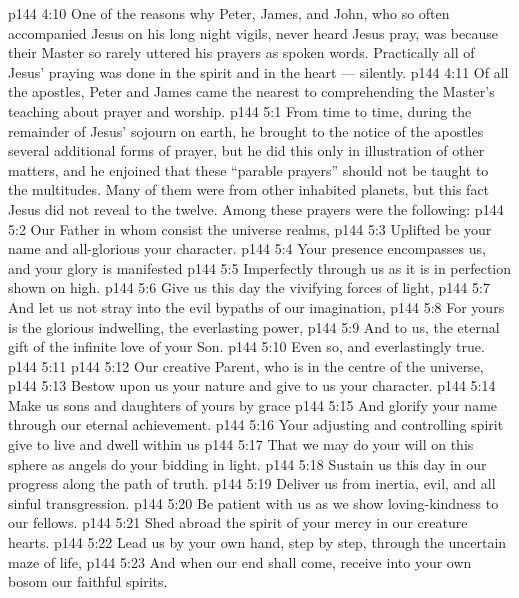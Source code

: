 \vs p144 4:10 \pc One of the reasons why Peter, James, and John, who so often accompanied Jesus on his long night vigils, never heard Jesus pray, was because their Master so rarely uttered his prayers as spoken words. Practically all of Jesus’ praying was done in the spirit and in the heart --- silently.
\vs p144 4:11 Of all the apostles, Peter and James came the nearest to comprehending the Master’s teaching about prayer and worship.
\vs p144 5:1 From time to time, during the remainder of Jesus’ sojourn on earth, he brought to the notice of the apostles several additional forms of prayer, but he did this only in illustration of other matters, and he enjoined that these “parable prayers” should not be taught to the multitudes. Many of them were from other inhabited planets, but this fact Jesus did not reveal to the twelve. Among these prayers were the following:
\vspace*{1ex}
\vs p144 5:2 Our Father in whom consist the universe realms,
\vs p144 5:3 \hsetoff Uplifted be your name and all\hyp{}glorious your character.
\vs p144 5:4 Your presence encompasses us, and your glory is manifested
\vs p144 5:5 \hsetoff Imperfectly through us as it is in perfection shown on high.
\vs p144 5:6 Give us this day the vivifying forces of light,
\vs p144 5:7 \hsetoff And let us not stray into the evil bypaths of our imagination,
\vs p144 5:8 For yours is the glorious indwelling, the everlasting power,
\vs p144 5:9 \hsetoff And to us, the eternal gift of the infinite love of your Son.
\vs p144 5:10 Even so, and everlastingly true.
\vs p144 5:11 \separatorshort
\vs p144 5:12 Our creative Parent, who is in the centre of the universe,
\vs p144 5:13 \hsetoff Bestow upon us your nature and give to us your character.
\vs p144 5:14 Make us sons and daughters of yours by grace
\vs p144 5:15 \hsetoff And glorify your name through our eternal achievement.
\vs p144 5:16 Your adjusting and controlling spirit give to live and dwell within us
\vs p144 5:17 \hsetoff That we may do your will on this sphere as angels do your bidding in light.
\vs p144 5:18 Sustain us this day in our progress along the path of truth.
\vs p144 5:19 \hsetoff Deliver us from inertia, evil, and all sinful transgression.
\vs p144 5:20 Be patient with us as we show loving\hyp{}kindness to our fellows.
\vs p144 5:21 \hsetoff Shed abroad the spirit of your mercy in our creature hearts.
\vs p144 5:22 Lead us by your own hand, step by step, through the uncertain maze of life,
\vs p144 5:23 \hsetoff And when our end shall come, receive into your own bosom our faithful spirits.
